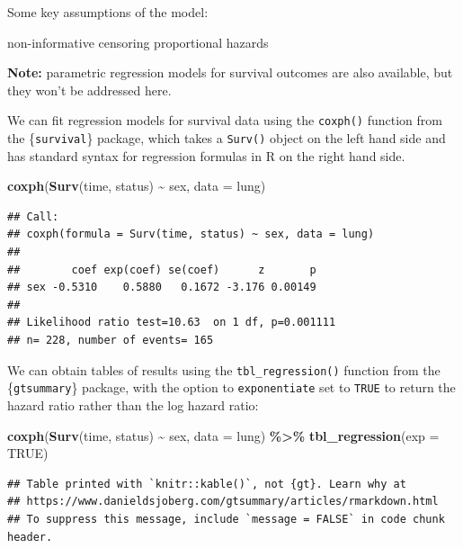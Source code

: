 \documentclass[
]{book}
\newenvironment{Shaded}{\begin{snugshade}}{\end{snugshade}}
\newcommand{\AttributeTok}[1]{\textcolor[rgb]{0.13,0.29,0.53}{#1}}
\newcommand{\ConstantTok}[1]{\textcolor[rgb]{0.56,0.35,0.01}{#1}}
\newcommand{\FunctionTok}[1]{\textcolor[rgb]{0.13,0.29,0.53}{\textbf{#1}}}
\newcommand{\NormalTok}[1]{#1}
\newcommand{\SpecialCharTok}[1]{\textcolor[rgb]{0.81,0.36,0.00}{\textbf{#1}}}
\begin{document}
Some key assumptions of the model:

non-informative censoring
proportional hazards

\textbf{Note:} parametric regression models for survival outcomes are also available, but they won't be addressed here.

We can fit regression models for survival data using the \texttt{coxph()} function from the \{\texttt{survival}\} package, which takes a \texttt{Surv()} object on the left hand side and has standard syntax for regression formulas in R on the right hand side.

\begin{Shaded}
\begin{Highlighting}[]
\FunctionTok{coxph}\NormalTok{(}\FunctionTok{Surv}\NormalTok{(time, status) }\SpecialCharTok{\textasciitilde{}}\NormalTok{ sex, }\AttributeTok{data =}\NormalTok{ lung)}
\end{Highlighting}
\end{Shaded}

\begin{verbatim}
## Call:
## coxph(formula = Surv(time, status) ~ sex, data = lung)
## 
##        coef exp(coef) se(coef)      z       p
## sex -0.5310    0.5880   0.1672 -3.176 0.00149
## 
## Likelihood ratio test=10.63  on 1 df, p=0.001111
## n= 228, number of events= 165
\end{verbatim}

We can obtain tables of results using the \texttt{tbl\_regression()} function from the \{\texttt{gtsummary}\} package, with the option to \texttt{exponentiate} set to \texttt{TRUE} to return the hazard ratio rather than the log hazard ratio:

\begin{Shaded}
\begin{Highlighting}[]
\FunctionTok{coxph}\NormalTok{(}\FunctionTok{Surv}\NormalTok{(time, status) }\SpecialCharTok{\textasciitilde{}}\NormalTok{ sex, }\AttributeTok{data =}\NormalTok{ lung) }\SpecialCharTok{\%\textgreater{}\%} 
  \FunctionTok{tbl\_regression}\NormalTok{(}\AttributeTok{exp =} \ConstantTok{TRUE}\NormalTok{)}
\end{Highlighting}
\end{Shaded}

\begin{verbatim}
## Table printed with `knitr::kable()`, not {gt}. Learn why at
## https://www.danieldsjoberg.com/gtsummary/articles/rmarkdown.html
## To suppress this message, include `message = FALSE` in code chunk header.
\end{verbatim}
\end{document}

